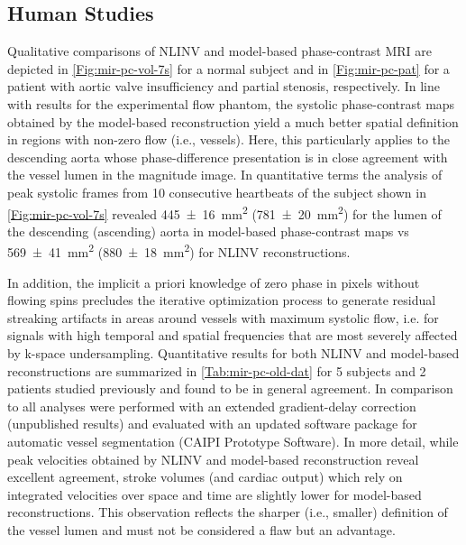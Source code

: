 \clearpage

\subsection{Human Studies}
Qualitative comparisons of NLINV and model-based phase-contrast MRI are depicted in \cref{Fig:mir-pc-vol-7s} for a normal subject and in \cref{Fig:mir-pc-pat} for a patient with aortic valve insufficiency and partial stenosis, respectively. In line with results for the experimental flow phantom, the systolic phase-contrast maps obtained by the model-based reconstruction yield a much better spatial definition in regions with non-zero flow (i.e., vessels). Here, this particularly applies to the descending aorta whose phase-difference presentation is in close agreement with the vessel lumen in the magnitude image. In quantitative terms the analysis of peak systolic frames from 10 consecutive heartbeats of the subject shown in \cref{Fig:mir-pc-vol-7s} revealed \SI{445+-16}{\square\mm} (\SI{781+-20}{\square\mm}) for the lumen of the descending (ascending) aorta in model-based phase-contrast maps vs \SI{569+-41}{\square\mm} (\SI{880+-18}{\square\mm}) for NLINV reconstructions.

In addition, the implicit a priori knowledge of zero phase in pixels without flowing spins precludes the iterative optimization process to generate residual streaking artifacts in areas around vessels with maximum systolic flow, i.e. for signals with high temporal and spatial frequencies that are most severely affected by k-space undersampling. Quantitative results for both NLINV and model-based reconstructions are summarized in \cref{Tab:mir-pc-old-dat} for 5 subjects and 2 patients studied previously \cite{2015_PC_Asym} and found to be in general agreement. In comparison to \cite{2015_PC_Asym} all analyses were performed with an extended gradient-delay correction (unpublished results) and evaluated with an updated software package for automatic vessel segmentation (CAIPI Prototype Software). In more detail, while peak velocities obtained by NLINV and model-based reconstruction reveal excellent agreement, stroke volumes (and cardiac output) which rely on integrated velocities over space and time are slightly lower for model-based reconstructions. This observation reflects the sharper (i.e., smaller) definition of the vessel lumen and must not be considered a flaw but an advantage.

